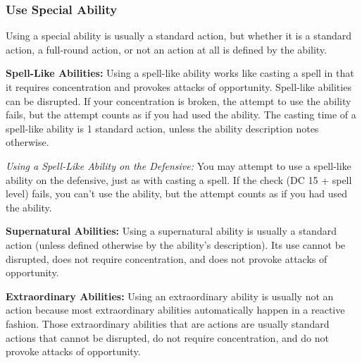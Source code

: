 \subsubsection{Use Special Ability}
Using a special ability is usually a standard action, but whether it is a standard action, a full-round action, or not an action at all is defined by the ability.

\textbf{Spell-Like Abilities:} Using a spell-like ability works like casting a spell in that it requires concentration and provokes attacks of opportunity. Spell-like abilities can be disrupted. If your concentration is broken, the attempt to use the ability fails, but the attempt counts as if you had used the ability. The casting time of a spell-like ability is 1 standard action, unless the ability description notes otherwise.

\textit{Using a Spell-Like Ability on the Defensive:} You may attempt to use a spell-like ability on the defensive, just as with casting a spell. If the  check (DC 15 + spell level) fails, you can't use the ability, but the attempt counts as if you had used the ability.

\textbf{Supernatural Abilities:} Using a supernatural ability is usually a standard action (unless defined otherwise by the ability's description). Its use cannot be disrupted, does not require concentration, and does not provoke attacks of opportunity.

\textbf{Extraordinary Abilities:} Using an extraordinary ability is usually not an action because most extraordinary abilities automatically happen in a reactive fashion. Those extraordinary abilities that are actions are usually standard actions that cannot be disrupted, do not require concentration, and do not provoke attacks of opportunity.